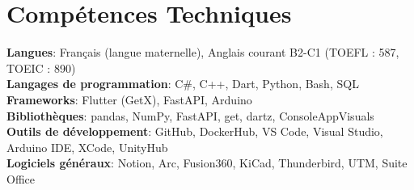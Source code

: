\documentclass[letterpaper,11pt]{article}
\begin{document}
\section{Compétences Techniques}
 \begin{itemize}[leftmargin=0.15in, label={}]
    \small{\item{
     \textbf{Langues}{: Français (langue maternelle), Anglais courant B2-C1 (TOEFL : 587, TOEIC : 890)} \\
     \textbf{Langages de programmation}{: C\#, C++, Dart, Python, Bash, SQL} \\
     \textbf{Frameworks}{: Flutter (GetX), FastAPI, Arduino} \\
     \textbf{Bibliothèques}{: pandas, NumPy, FastAPI, get, dartz, ConsoleAppVisuals} \\
     \textbf{Outils de développement}{: GitHub, DockerHub, VS Code, Visual Studio, Arduino IDE, XCode, UnityHub} \\
     \textbf{Logiciels généraux}{: Notion, Arc, Fusion360, KiCad, Thunderbird, UTM, Suite Office}
    }}
 \end{itemize}
\end{document}
